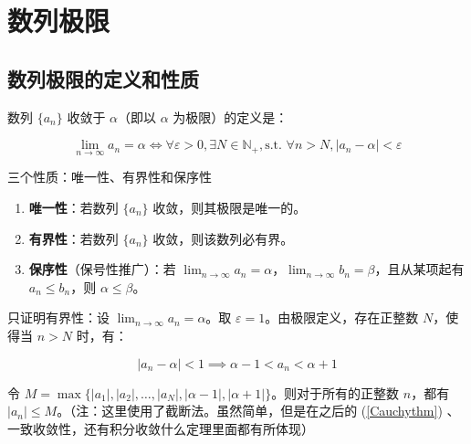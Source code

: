 \chapter{数列极限}

\section{数列极限的定义和性质}

\begin{definition}[数列极限]

数列 $\displaystyle \lbrace a_n \rbrace$ 收敛于 ${\alpha}$（即以 ${\alpha}$ 为极限）的定义是：

$$
\displaystyle \lim_{n \to \infty} a_n = {\alpha} \iff \forall {\varepsilon} > 0, \exists N \in \mathbb{N}_{+}, \text{s.t. } \forall n > N, \vert a_n - {\alpha} \vert < {\varepsilon}
$$

\end{definition}

\begin{proposition}[数列极限的性质]

三个性质：唯一性、有界性和保序性

\begin{enumerate}
  \item {\textbf{唯一性}：若数列 $\displaystyle \lbrace a_n \rbrace$ 收敛，则其极限是唯一的。}\item {\textbf{有界性}：若数列 $\displaystyle \lbrace a_n \rbrace$ 收敛，则该数列必有界。}\item {\textbf{保序性}（保号性推广）：若 $\displaystyle \lim_{n \to \infty} a_n = {\alpha}$，$\displaystyle \lim_{n \to \infty} b_n = \beta$，且从某项起有 $\displaystyle a_n \le b_n$，则 $\displaystyle {\alpha} \le \beta$。}
\end{enumerate}

\end{proposition}

只证明有界性：设 $\displaystyle \lim_{n \to \infty} a_n = {\alpha}$。取 $\displaystyle {\varepsilon} = 1$。由极限定义，存在正整数 $\displaystyle N$，使得当 $\displaystyle n > N$ 时，有：

$$
\displaystyle \vert a_n - {\alpha} \vert < 1 \implies {\alpha} - 1 < a_n < {\alpha} + 1
$$

令 $\displaystyle M = \max \lbrace \vert a_1 \vert, \vert a_2 \vert, \dots, \vert a_N \vert, \vert {\alpha} - 1 \vert, \vert {\alpha} + 1 \vert \rbrace$。则对于所有的正整数 $\displaystyle n$，都有 $\displaystyle \vert a_n \vert \le M$。（注：这里使用了截断法。虽然简单，但是在之后的 (\ref{Cauchythm}) 、一致收敛性，还有积分收敛什么定理里面都有所体现）

